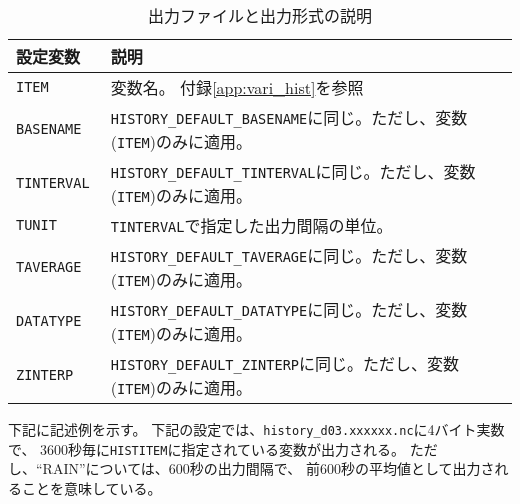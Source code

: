 \begin{table}[htb]
\begin{center}
\caption{出力ファイルと出力形式の説明}
\begin{tabularx}{150mm}{|l|X|} \hline
 \rowcolor[gray]{0.9} 設定変数 & 説明 \\ \hline
 \verb|ITEM      | & 変数名。 付録\ref{app:vari_hist}を参照\\ \hline
 \verb|BASENAME  | & \verb|HISTORY_DEFAULT_BASENAME|に同じ。ただし、変数(\verb|ITEM|)のみに適用。\\ \hline
 \verb|TINTERVAL | & \verb|HISTORY_DEFAULT_TINTERVAL|に同じ。ただし、変数(\verb|ITEM|)のみに適用。\\ \hline
 \verb|TUNIT     | & \verb|TINTERVAL|で指定した出力間隔の単位。\\ \hline
 \verb|TAVERAGE  | & \verb|HISTORY_DEFAULT_TAVERAGE|に同じ。ただし、変数(\verb|ITEM|)のみに適用。\\ \hline
 \verb|DATATYPE  | & \verb|HISTORY_DEFAULT_DATATYPE|に同じ。ただし、変数(\verb|ITEM|)のみに適用。\\ \hline
 \verb|ZINTERP   | & \verb|HISTORY_DEFAULT_ZINTERP|に同じ。ただし、変数(\verb|ITEM|)のみに適用。\\ \hline
\end{tabularx}
\label{tab:histitem}
\end{center}
\end{table}



下記に記述例を示す。
下記の設定では、\verb|history_d03.xxxxxx.nc|に4バイト実数で、
3600秒毎に\verb|HISTITEM|に指定されている変数が出力される。
ただし、``RAIN''については、600秒の出力間隔で、
前600秒の平均値として出力されることを意味している。\\

\\


